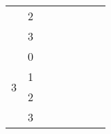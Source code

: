 \documentclass{article}
\newcommand{\blk}{\cellcolor{darkgray}}
\newcommand{\red}{\cellcolor{red!33}}
\newcommand{\grn}{\cellcolor{green!33}}
\newcommand{\ylw}{\cellcolor{yellow}}
\newcommand{\nothing}{\text{\raisebox{0.4em}{\rotatebox{180}{$\curvearrowleft$}}}}%
\newcommand{\just}[1]{\boxed{#1}}%
\newcommand{\incl}{\mathbf{incl}}
\newcommand{\excl}{\mathbf{excl}}
\begin{document}
\begin{table}[H]
\begin{tabular}{c|c|c|c|c|c|c|c|}
				               &  2                        &    \blk           & \blk           & \red\just\excl & \grn\just\incl & \blk           & \blk           \\\cline{2-8}
				               &  3                        &    \ylw           & \ylw           & \ylw\nothing   & \ylw\nothing   & \ylw           & \ylw           \\\hline\hline
			\multirow{4}{*}{3}     &  0                        &    \blk           & \blk           & \blk           & \blk           & \blk           & \blk           \\\cline{2-8}
				               &  1                        &    \ylw           & \ylw           & \ylw           & \ylw           & \ylw           & \ylw           \\\cline{2-8}
				               &  2                        &    \blk           & \blk           & \blk           & \blk           & \blk           & \blk           \\\cline{2-8}
				               &  3                        &    \ylw           & \ylw           & \ylw           & \ylw           & \ylw           & \ylw           \\\hline
		\end{tabular}
	\end{table}
\end{document}
